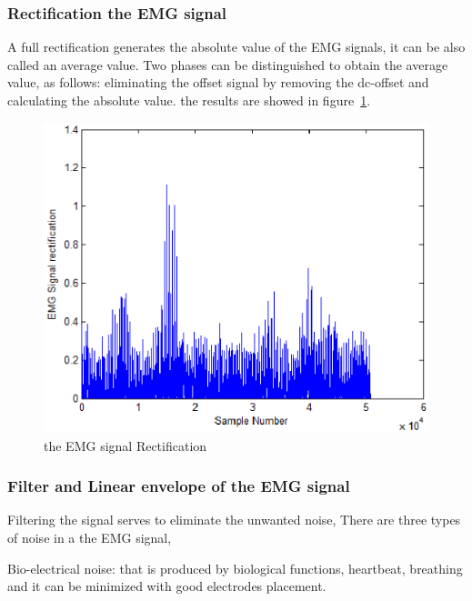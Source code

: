 \documentclass[conference]{IEEEtran}
\begin{document}
\subsubsection{Rectification the EMG signal} \label{sub:RectificationtheEMGsignal}\par
A full rectification generates the absolute value of the EMG signals, it can be also called an average value. Two phases can be distinguished to obtain the average value, as follows: eliminating the offset signal by removing the dc-offset and calculating the absolute value. the results are showed in figure~\ref{fig:rect}.\par

\begin{figure}
    \hspace*{1.2 cm}
    \includegraphics[scale=0.40]{Figures/fig2.eps}
    \caption{the EMG signal Rectification}
    \label{fig:rect}
\end{figure}

\subsubsection{Filter and Linear envelope of the EMG signal } \label{sub:LinearenvelopeoftheEMGsignal}\par
Filtering the signal serves to eliminate the unwanted noise, There are three types of noise in a the EMG signal, \par
Bio-electrical noise: that is produced by biological functions, heartbeat, breathing and it can be minimized with good electrodes placement.\par
\end{document}
